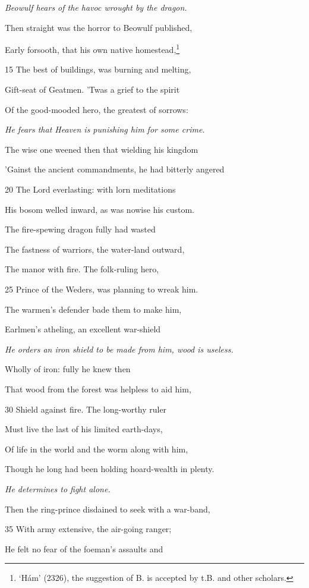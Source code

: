 \emph{Beowulf hears of
the havoc wrought
by the dragon.}

Then straight was the horror to Beowulf published,

Early forsooth, that his own native homestead,\footnote{‘Hám’ (2326), the suggestion of B. is accepted by t.B. and other
scholars.}

15
The best of buildings, was burning and melting,

Gift-seat of Geatmen. ’Twas a grief to the spirit

Of the good-mooded hero, the greatest of sorrows:

\emph{He fears that
Heaven is punishing
him for some
crime.}

The wise one weened then that wielding his kingdom

’Gainst the ancient commandments, he had bitterly angered

20
The Lord everlasting: with lorn meditations

His bosom welled inward, as was nowise his custom.

The fire-spewing dragon fully had wasted

The fastness of warriors, the water-land outward,

The manor with fire. The folk-ruling hero,

25
Prince of the Weders, was planning to wreak him.

The warmen’s defender bade them to make him,

Earlmen’s atheling, an excellent war-shield

\emph{He orders an iron
shield to be made
from him, wood is
useless.}

Wholly of iron: fully he knew then

That wood from the forest was helpless to aid him,

30
Shield against fire. The long-worthy ruler

Must live the last of his limited earth-days,

Of life in the world and the worm along with him,

Though he long had been holding hoard-wealth in plenty.

\emph{He determines to
fight alone.}

Then the ring-prince disdained to seek with a war-band,

35
With army extensive, the air-going ranger;

He felt no fear of the foeman’s assaults and


